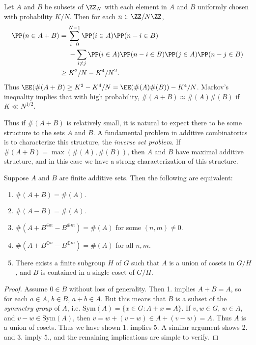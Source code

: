 \begin{example}
    Let $A$ and $B$ be subsets of $\ZZ_N$ with each element in $A$ and $B$ uniformly chosen with probability $K/N$. Then for each $n \in \ZZ / N \ZZ$,
    \begin{align*}
        \PP(n \in A + B) &= \sum_{i = 0}^{N-1} \PP(i \in A) \PP(n-i \in B)\\
        &\ \ \ \ - \sum_{i \neq j} \PP(i \in A) \PP(n-i \in B) \PP(j \in A) \PP(n-j \in B)\\
        &\geq K^2/N - K^4/N^2.
    \end{align*}
    Thus $\EE(\#(A + B) \geq K^2 - K^4/N = \EE(\#(A) \#(B)) - K^4/N$. Markov's inequality implies that with high probability, $\#(A + B) \approx \#(A) \#(B)$ if $K \ll N^{1/2}$.
\end{example}

Thus if $\#(A+B)$ is relatively small, it is natural to expect there to be some structure to the sets $A$ and $B$. A fundamental problem in additive combinatorics is to characterize this structure, the \emph{inverse set problem}. If $\#(A + B) = \max(\#(A), \#(B))$, then $A$ and $B$ have maximal additive structure, and in this case we have a strong characterization of this structure.

\begin{theorem}
    Suppose $A$ and $B$ are finite additive sets. Then the following are equivalent:
    \begin{enumerate}
        \item $\#(A + B) = \#(A)$.
        \item $\#(A - B) = \#(A)$.
        \item $\#(A + B^{\oplus n} - B^{\oplus m}) = \#(A)$ for some $(n,m) \neq 0$.
        \item $\#(A + B^{\oplus n} - B^{\oplus m}) = \#(A)$ for all $n,m$.
        \item There exists a finite subgroup $H$ of $G$ such that $A$ is a union of cosets in $G/H$, and $B$ is contained in a single coset of $G/H$. 
    \end{enumerate}
\end{theorem}
\begin{proof}
    Assume $0 \in B$ without loss of generality. Then 1. implies $A + B = A$, so for each $a \in A$, $b \in B$, $a + b \in A$. But this means that $B$ is a subset of the \emph{symmetry group} of $A$, i.e. $\text{Sym}(A) = \{ x \in G : A + x = A \}$. If $v,w \in G$, $w \in A$, and $v - w \in \text{Sym}(A)$, then $v = w + (v - w) \in A + (v - w) = A$. Thus $A$ is a union of cosets. Thus we have shown 1. implies 5. A similar argument shows 2. and 3. imply 5., and the remaining implications are simple to verify.
\end{proof}

